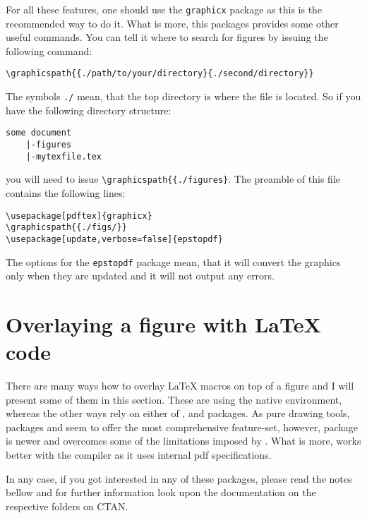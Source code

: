 \documentclass[
]{scrartcl}
\begin{document}
%
For all these features, one should use the \verb|graphicx| package as this is
    the recommended way to do it. 
%
What is more, this packages provides some other useful commands. 
%
You can tell it where to search for figures by issuing the following command:
%
\begin{lstlisting}
\graphicspath{{./path/to/your/directory}{./second/directory}}    
\end{lstlisting}
%
The symbols \verb|./| mean, that the top directory is where the  file
    is located. 
%
So if you have the following directory structure:
%
\begin{lstlisting}
some document
    |-figures
    |-mytexfile.tex
\end{lstlisting}
    you will need to issue \verb|\graphicspath{{./figures}|. 
%
The preamble of this file contains the following lines:
%
\begin{lstlisting}
\usepackage[pdftex]{graphicx}
\graphicspath{{./figs/}}
\usepackage[update,verbose=false]{epstopdf}
\end{lstlisting}

%
The options for the \verb|epstopdf| package mean, that it will convert the
     graphics only when they are updated and it will not output any
    errors.

\clearpage
\section{Overlaying a figure with \LaTeX{} code}

%
There are many ways how to overlay \LaTeX{} macros on top of a figure and I will
    present some of them in this section.
%
These are using the native  environment, whereas the other ways
    rely on either of ,  and  packages.
%
As pure drawing tools, packages  and  seem to offer the
    most comprehensive feature-set, however,  package is newer and
    overcomes some of the limitations imposed by .
%
What is more,  works better with the  compiler as it
    uses internal pdf specifications.

%
In any case, if you got interested in any of these packages, please read the
    notes bellow and for further information look upon the documentation on the
    respective folders on CTAN.
\end{document}
